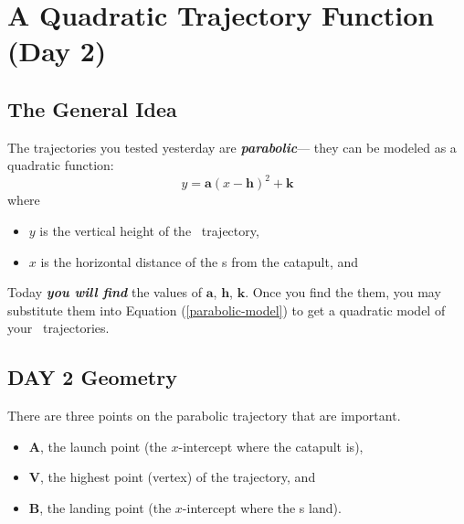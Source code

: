 \newpage 
\section{A Quadratic Trajectory Function (Day 2)}






\subsection{The General Idea}

The trajectories you tested yesterday are {\bfseries\itshape parabolic}---%
they can be modeled as a quadratic function:
\begin{equation}\label{parabolic-model}
    y = \bm{a}(x-\bm{h})^2 + \bm{k}
\end{equation} 
where 
\begin{itemize}[nosep]
    \item $y$ is the vertical height of the \mymm~trajectory, 
    \item $x$ is the horizontal distance of the \mymm{}s from the catapult, and
\end{itemize}

Today 
{\bfseries\itshape you will find} the values of $\bm{a}$, $\bm{h}$, $\bm{k}$.
Once you find the them, 
you may substitute them into Equation (\ref{parabolic-model}) to get a 
quadratic model of your \mymm~trajectories.





\subsection{DAY 2 Geometry}

There are three points on the parabolic trajectory that are important.
\begin{itemize}[nosep]
    \item $\bm{A}$, the launch point (the $x$-intercept where the catapult is),
    \item $\bm{V}$, the highest point (vertex) of the trajectory, and
    \item $\bm{B}$, the landing point (the $x$-intercept where the \mymm{}s land). 
\end{itemize}


